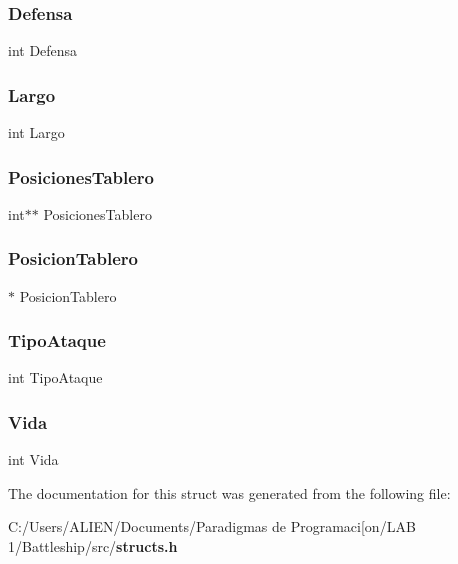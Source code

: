 \label{struct_ship_ac3b0b433e1068211fccdf5735e5fc774} 
\subsubsection{Defensa}
{\footnotesize\ttfamily int Defensa}

\label{struct_ship_a4eebc7aa4a2fda198301dd0846817886} 
\subsubsection{Largo}
{\footnotesize\ttfamily int Largo}

\label{struct_ship_a69af89b7958264af53ca17e3bfccc05b} 
\subsubsection{Posiciones\+Tablero}
{\footnotesize\ttfamily int$\ast$$\ast$ Posiciones\+Tablero}

\label{struct_ship_ab317681e869f6ab39667acc8d18e48b3} 
\subsubsection{Posicion\+Tablero}
{\footnotesize{}$\ast$ Posicion\+Tablero}

\label{struct_ship_aba97513f0f32e712f1e00c178c5dece5} 
\subsubsection{Tipo\+Ataque}
{\footnotesize\ttfamily int Tipo\+Ataque}

\label{struct_ship_a0841c27ae19b663ca0657b811a9cafa7} 
\subsubsection{Vida}
{\footnotesize\ttfamily int Vida}



The documentation for this struct was generated from the following file\+:\begin{DoxyCompactItemize}
\item 
C\+:/\+Users/\+A\+L\+I\+E\+N/\+Documents/\+Paradigmas de Programaci[on/\+L\+A\+B 1/\+Battleship/src/{\bf structs.\+h}\end{DoxyCompactItemize}
